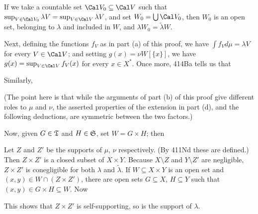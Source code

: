 {

\noindent If we take a countable set $\Cal V_0\subseteq\Cal V$ such that
$\sup_{V\in\Cal V_0}\lambda V=\sup_{V\in\Cal V}\lambda V$, and set
$W_0=\bigcup\Cal V_0$, then $W_0$ is an open set, belonging to $\lambda$
and included in $W$, and $\lambda W_0=\tilde\lambda W$.

Next, defining the functions $f_V$ as in part (a) of this
proof, we have $\int f_Vd\mu=\lambda V$ for every $V\in\Cal V$;  and
setting $g(x)=\nu W[\{x\}]$, we have $g(x)=\sup_{V\in\Cal V}f_V(x)$ for
every $x\in X^*$.   Once more, 414Ba tells us that


\noindent Similarly,


\noindent (The point here is that while the arguments of part (b) of
this proof give different roles to $\mu$ and $\nu$, the asserted properties
of the extension in part (d), and the following deductions, are
symmetric between the two factors.)

Now, given $G\in\frak T$ and $H\in\frak S$, set $W=G\times H$;  then


\medskip

 Let $Z$ and $Z'$ be the supports of $\mu$, $\nu$
respectively.   (By 411Nd these are defined.)   Then $Z\times Z'$ is a
closed subset of $X\times Y$.
Because $X\setminus Z$ and
$Y\setminus Z'$ are negligible, $Z\times Z'$ is conegligible for both
$\lambda$ and $\tilde\lambda$.
If $W\subseteq X\times Y$ is an open set and
$(x,y)\in W\cap(Z\times Z')$, there are open sets $G\subseteq X$,
$H\subseteq Y$ such that $(x,y)\in G\times H\subseteq W$.   Now


\noindent This shows that $Z\times Z'$ is self-supporting, so is the
support of $\lambda$.

\medskip

}

